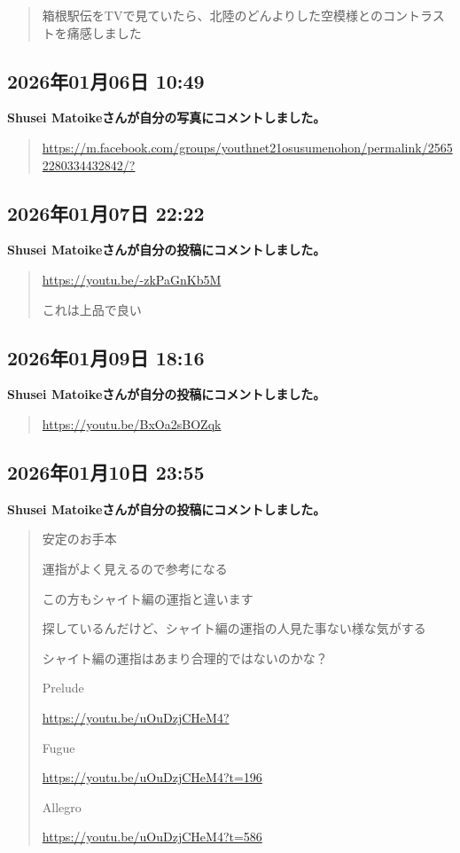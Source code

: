 \begin{quote}
箱根駅伝をTVで見ていたら、北陸のどんよりした空模様とのコントラストを痛感しました
\end{quote}

\subsection*{2026年01月06日 10:49}

\textbf{Shusei Matoikeさんが自分の写真にコメントしました。}

\begin{quote}
\url{https://m.facebook.com/groups/youthnet21osusumenohon/permalink/25652280334432842/?}
\end{quote}

\subsection*{2026年01月07日 22:22}

\textbf{Shusei Matoikeさんが自分の投稿にコメントしました。}

\begin{quote}
\url{https://youtu.be/-zkPaGnKb5M}

これは上品で良い
\end{quote}

\subsection*{2026年01月09日 18:16}

\textbf{Shusei Matoikeさんが自分の投稿にコメントしました。}

\begin{quote}
\url{https://youtu.be/BxOa2sBOZqk}
\end{quote}

\subsection*{2026年01月10日 23:55}

\textbf{Shusei Matoikeさんが自分の投稿にコメントしました。}

\begin{quote}
安定のお手本

運指がよく見えるので参考になる

この方もシャイト編の運指と違います

探しているんだけど、シャイト編の運指の人見た事ない様な気がする

シャイト編の運指はあまり合理的ではないのかな？

Prelude

\url{https://youtu.be/uOuDzjCHeM4?}

Fugue

\url{https://youtu.be/uOuDzjCHeM4?t=196}

Allegro

\url{https://youtu.be/uOuDzjCHeM4?t=586}
\end{quote}

